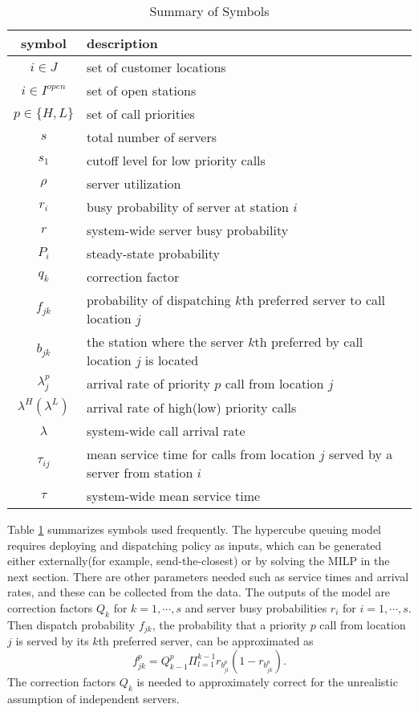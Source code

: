 \documentclass{article}
\begin{document}
\begin{table}
\centering
\begin{tabular}{c l}
\hline
\hline
\textbf{symbol} & \textbf{description} \\
\hline
 $i \in J$	& set of customer locations \\
 $i \in I^{open}$ & set of open stations \\
 $p \in \{H,L\}$ & set of call priorities \\
 $ s $ 	& total number of servers \\
 $ s_1 $& cutoff level for low priority calls\\
 $\rho$ & server utilization \\
 $ r_i$ & busy probability of server at station $i$ \\
 $ r $ 	& system-wide server busy probability \\
 $P_i$ 	& steady-state probability \\
 $q_k$ 	& correction factor \\
 $f_{jk}$ & probability of dispatching $k$th preferred server to call location $j$ \\ 
 $b_{jk}$ & the station where the server $k$th preferred by call location $j$ is located \\
 $\lambda_{j}^p$ & arrival rate of priority $p$ call from location $j$\\
 $\lambda^H(\lambda^L)$ & arrival rate of high(low) priority calls\\
 $\lambda$ & system-wide call arrival rate\\
 $\tau_{ij}$ & mean service time for calls from location $j$ served by a server from station $i$ \\
 $\tau$ & system-wide mean service time\\
\hline
\end{tabular}
\caption{Summary of Symbols}
\label{table:symbol}
\end{table}


Table \ref{table:symbol} summarizes symbols used frequently. The hypercube queuing model requires deploying and dispatching policy as inputs, which can be generated either externally(for example, send-the-closest) or by solving the MILP in the next section. There are other parameters needed such as service times and arrival rates, and these can be collected from the data. The outputs of the model are correction factors $Q_k$ for $k=1,\cdots,s$ and server busy probabilities $r_i$ for $i=1,\cdots,s$. Then dispatch probability $f_{jk}$, the probability that a priority $p$ call from location $j$ is served by its $k$th preferred server, can be approximated as
\begin{equation} \label{dispatchprobability}
f^p_{jk} = Q^p_{k-1} \Pi_{l=1}^{k-1} r_{b^p_{jl}}(1-r_{b^p_{jk}}).
\end{equation}
The correction factors $Q_k$ is needed to approximately correct for the unrealistic assumption of independent servers. 
\end{document}
